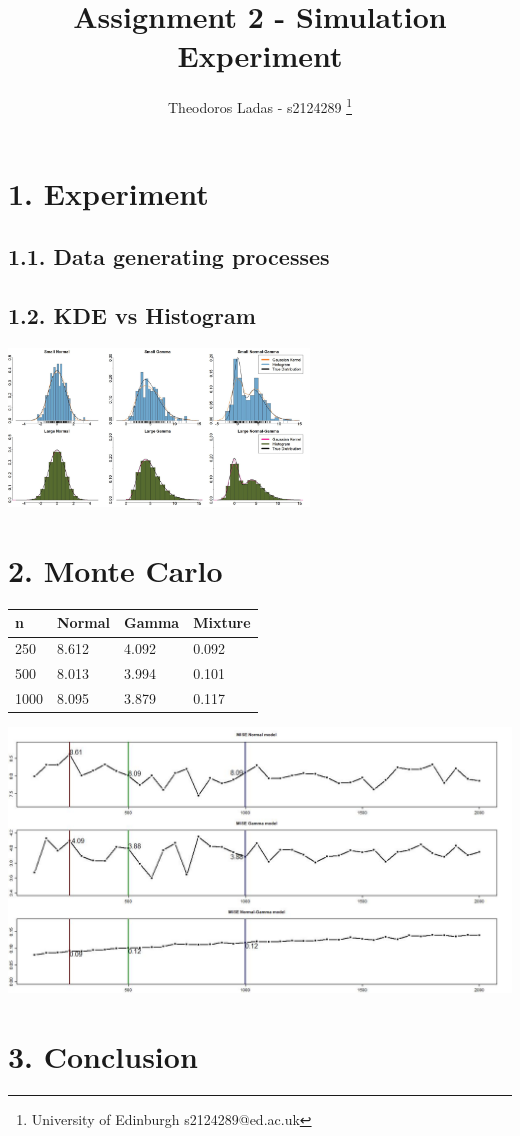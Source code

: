 \documentclass[fleqn, a4paper]{report}
\title{Assignment 2 - Simulation Experiment}
\author{
Theodoros Ladas - s2124289 
\footnote{University of Edinburgh s2124289@ed.ac.uk}
}
\date{\parbox{\linewidth}{\centering%
  January 10, 2021\endgraf\bigskip
  Coordinator: Miguel de Carvalho\endgraf\medskip
  Dept.\ of Mathematics \endgraf
  University of Edinburgh}}
\begin{document}
\maketitle

\section*{1. Experiment}







\subsection*{1.1. Data generating processes}

\subsection*{1.2. KDE vs Histogram}


\includegraphics[width=0.6\textwidth]{./images/hist_vs_GKDE.jpg}



\section*{2. Monte Carlo}


\begin{tabular}{|l|lll|}
\hline
n    & Normal & Gamma & Mixture \\ \hline
250  & 8.612  & 4.092 & 0.092   \\
500  & 8.013  & 3.994 & 0.101   \\
1000 & 8.095  & 3.879 & 0.117   \\ \hline
\end{tabular}



\includegraphics[width=1\textwidth]{./images/MISE error.jpg}



\section*{3. Conclusion}



\end{document}
